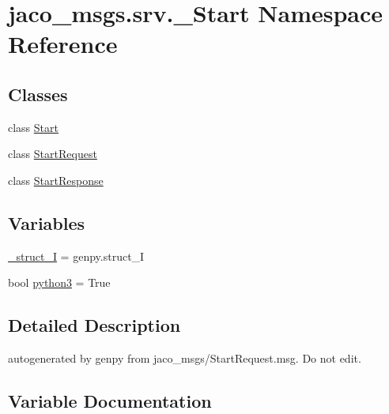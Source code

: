 \hypertarget{namespacejaco__msgs_1_1srv_1_1__Start}{}\section{jaco\+\_\+msgs.\+srv.\+\_\+\+Start Namespace Reference}
\label{namespacejaco__msgs_1_1srv_1_1__Start}
\subsection*{Classes}
\begin{DoxyCompactItemize}
\item 
class \hyperlink{classjaco__msgs_1_1srv_1_1__Start_1_1Start}{Start}
\item 
class \hyperlink{classjaco__msgs_1_1srv_1_1__Start_1_1StartRequest}{Start\+Request}
\item 
class \hyperlink{classjaco__msgs_1_1srv_1_1__Start_1_1StartResponse}{Start\+Response}
\end{DoxyCompactItemize}
\subsection*{Variables}
\begin{DoxyCompactItemize}
\item 
\hyperlink{namespacejaco__msgs_1_1srv_1_1__Start_adfbc7498a7ace68386ae41ef7958a461}{\+\_\+struct\+\_\+I} = genpy.\+struct\+\_\+I
\item 
bool \hyperlink{namespacejaco__msgs_1_1srv_1_1__Start_a0a5d301ebd1ae8358bb724d102515606}{python3} = True
\end{DoxyCompactItemize}


\subsection{Detailed Description}
\begin{DoxyVerb}autogenerated by genpy from jaco_msgs/StartRequest.msg. Do not edit.\end{DoxyVerb}
 

\subsection{Variable Documentation}
